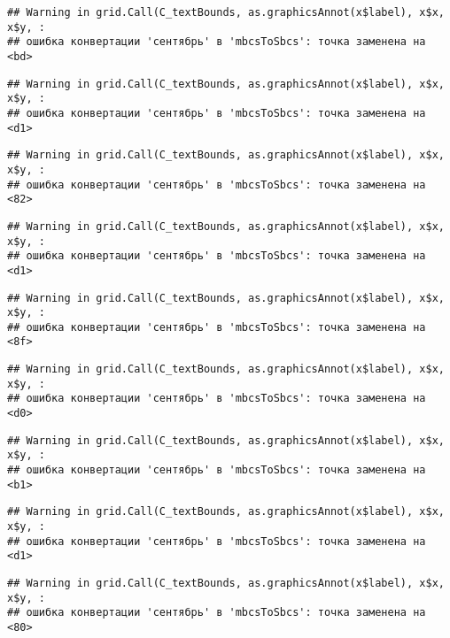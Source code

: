 \documentclass[
]{article}
\begin{document}
\begin{verbatim}
## Warning in grid.Call(C_textBounds, as.graphicsAnnot(x$label), x$x, x$y, :
## ошибка конвертации 'сентябрь' в 'mbcsToSbcs': точка заменена на <bd>
\end{verbatim}

\begin{verbatim}
## Warning in grid.Call(C_textBounds, as.graphicsAnnot(x$label), x$x, x$y, :
## ошибка конвертации 'сентябрь' в 'mbcsToSbcs': точка заменена на <d1>
\end{verbatim}

\begin{verbatim}
## Warning in grid.Call(C_textBounds, as.graphicsAnnot(x$label), x$x, x$y, :
## ошибка конвертации 'сентябрь' в 'mbcsToSbcs': точка заменена на <82>
\end{verbatim}

\begin{verbatim}
## Warning in grid.Call(C_textBounds, as.graphicsAnnot(x$label), x$x, x$y, :
## ошибка конвертации 'сентябрь' в 'mbcsToSbcs': точка заменена на <d1>
\end{verbatim}

\begin{verbatim}
## Warning in grid.Call(C_textBounds, as.graphicsAnnot(x$label), x$x, x$y, :
## ошибка конвертации 'сентябрь' в 'mbcsToSbcs': точка заменена на <8f>
\end{verbatim}

\begin{verbatim}
## Warning in grid.Call(C_textBounds, as.graphicsAnnot(x$label), x$x, x$y, :
## ошибка конвертации 'сентябрь' в 'mbcsToSbcs': точка заменена на <d0>
\end{verbatim}

\begin{verbatim}
## Warning in grid.Call(C_textBounds, as.graphicsAnnot(x$label), x$x, x$y, :
## ошибка конвертации 'сентябрь' в 'mbcsToSbcs': точка заменена на <b1>
\end{verbatim}

\begin{verbatim}
## Warning in grid.Call(C_textBounds, as.graphicsAnnot(x$label), x$x, x$y, :
## ошибка конвертации 'сентябрь' в 'mbcsToSbcs': точка заменена на <d1>
\end{verbatim}

\begin{verbatim}
## Warning in grid.Call(C_textBounds, as.graphicsAnnot(x$label), x$x, x$y, :
## ошибка конвертации 'сентябрь' в 'mbcsToSbcs': точка заменена на <80>
\end{verbatim}
\end{document}
